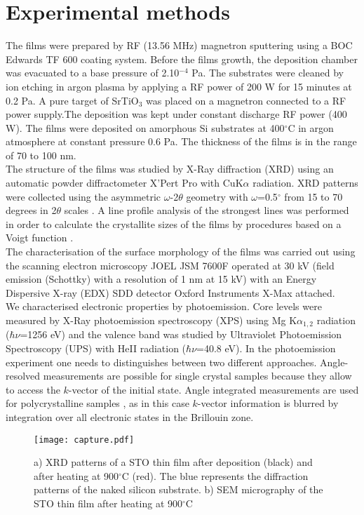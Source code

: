 \documentclass{aip-cp}
\begin{document}
\section{Experimental methods}
The films were prepared by RF (13.56 MHz) magnetron sputtering using a BOC Edwards TF 600 coating system. Before the films growth, the deposition chamber was evacuated to a base pressure of 2.10$^{-4}$ Pa. The substrates were cleaned by ion etching in argon plasma by applying a RF power of 200 W for 15 minutes at 0.2 Pa. A pure target of SrTiO$_{3}$ was placed on a magnetron connected to a RF power supply.The deposition was kept under constant discharge RF power (400 W). The films were deposited on amorphous Si substrates at 400$^{\circ}$C in argon atmosphere at constant pressure 0.6 Pa. The thickness of the films is in the range of 70 to 100 nm.
\\The structure of the films was studied by X-Ray diffraction (XRD) using an automatic powder diffractometer X’Pert  Pro with CuK$\alpha$ radiation. XRD patterns were collected using the asymmetric $\omega$-2$\theta$ geometry with $\omega$=0.5$^{\circ}$ from 15 to 70 degrees in 2$\theta$ scales \cite{bib13}. A line profile analysis of the strongest lines was performed in order to calculate the crystallite sizes of the films by procedures based on a Voigt function \cite{bib14,bib15}.
\\The characterisation of the surface morphology of the films was carried out using the scanning electron microscopy JOEL JSM 7600F operated at 30 kV (field emission (Schottky) with a resolution of 1 nm at 15 kV) with an Energy Dispersive X-ray (EDX) SDD detector Oxford Instruments X-Max attached. 
\\We characterised electronic properties by photoemission. Core levels were measured by X-Ray photoemission spectroscopy (XPS) using Mg K$\alpha_{1,2}$ radiation ($\hbar\nu$=1256 eV) and the valence band was studied by Ultraviolet Photoemission Spectroscopy (UPS) with HeII radiation ($\hbar\nu$=40.8 eV).
In the photoemission experiment one needs to distinguishes between two different approaches. Angle-resolved measurements are possible for single crystal samples because they allow to access the $k$-vector of the initial state. Angle integrated measurements are used for polycrystalline samples \cite{bib12}, as in this case $k$-vector information is blurred by integration over all electronic states in the Brillouin zone.


\begin{figure}[h!]
	\centerline{\texttt{[image: capture.pdf]}}
	\caption{a) XRD patterns of a STO thin film after deposition (black) and after heating at 900$^{\circ}$C (red). The blue represents the diffraction patterns of the naked silicon substrate. b) SEM micrography of the STO thin film after heating at 900$^{\circ}$C }
\end{figure}
\end{document}
